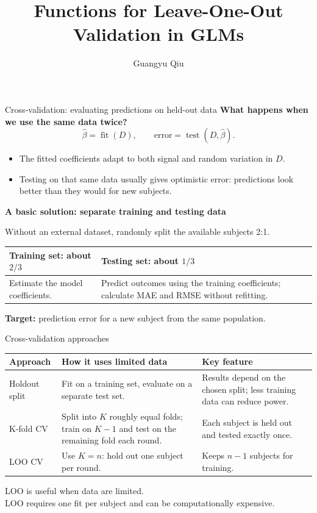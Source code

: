 \documentclass[11pt,aspectratio=169]{beamer}
\title{Functions for Leave-One-Out\\Validation in GLMs}
\author{Guangyu Qiu}
\date{}
\begin{document}
\begin{frame}
  \titlepage
\end{frame}

\begin{frame}{Cross-validation: evaluating predictions on held-out data}
\textbf{What happens when we use the same data twice?}
\[
  \widehat\beta = \operatorname{fit}(D),
  \qquad \text{error} = \operatorname{test}(D,\widehat\beta).
\]
\begin{itemize}
  \item The fitted coefficients adapt to both signal and random variation in $D$.
  \item Testing on that same data usually gives optimistic error: predictions look better than they would for new subjects.
\end{itemize}

\medskip
\textbf{A basic solution: separate training and testing data}

Without an external dataset, randomly split the available subjects 2:1.

\medskip
\renewcommand{\arraystretch}{1.2}
\begin{tabular}{@{}p{}p{}@{}}
\toprule
\textbf{Training set: about $2/3$} & \textbf{Testing set: about $1/3$} \\
\midrule
Estimate the model coefficients. & Predict outcomes using the training coefficients; calculate MAE and RMSE without refitting. \\
\bottomrule
\end{tabular}

\medskip
\textbf{Target:} prediction error for a new subject from the same population.
\end{frame}

\begin{frame}{Cross-validation approaches}
\renewcommand{\arraystretch}{1.25}
\begin{tabular}{@{}p{}p{}p{}@{}}
\toprule
\textbf{Approach} & \textbf{How it uses limited data} & \textbf{Key feature} \\
\midrule
Holdout split & Fit on a training set, evaluate on a separate test set. & Results depend on the chosen split; less training data can reduce power. \\
\midrule
K-fold CV & Split into $K$ roughly equal folds; train on $K-1$ and test on the remaining fold each round. & Each subject is held out and tested exactly once. \\
\midrule
LOO CV & Use $K=n$: hold out one subject per round. & Keeps $n-1$ subjects for training. \\
\bottomrule
\end{tabular}

\medskip
\small LOO is useful when data are limited.\\
LOO requires one fit per subject and can be computationally expensive.
\end{frame}
\end{document}
